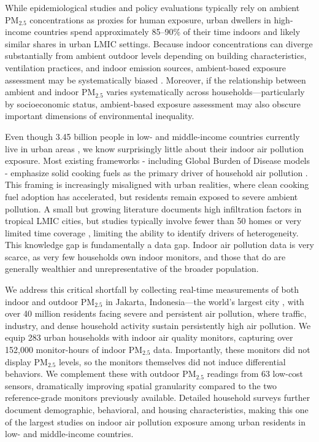 \documentclass[9pt,twocolumn,twoside]{pnas-new}
\begin{document}
While epidemiological studies and policy evaluations typically rely on ambient PM$_{2.5}$ concentrations as proxies for human exposure, urban dwellers in high-income countries spend approximately 85–90\% of their time indoors \citep{klepeis_national_2001} and likely similar shares in urban LMIC settings.
Because indoor concentrations can diverge substantially from ambient outdoor levels depending on building characteristics, ventilation practices, and indoor emission sources, ambient-based exposure assessment may be systematically biased \citep{avery_estimating_2010, evangelopoulos_pm25_2020}. Moreover, if the relationship between ambient and indoor PM$_{2.5}$ varies systematically across households—particularly by socioeconomic status, ambient-based exposure assessment may also obscure important dimensions of environmental inequality. 

Even though 3.45 billion people in low- and middle-income countries currently live in urban areas \citep{noauthor_urban_2023}, we know surprisingly little about their indoor air pollution exposure. Most existing frameworks - including Global Burden of Disease models - emphasize solid cooking fuels as the primary driver of household air pollution \citep{bennitt_global_2025}. This framing is increasingly misaligned with urban realities, where clean cooking fuel adoption has accelerated, but residents remain exposed to severe ambient pollution. A small but growing literature documents high infiltration factors in tropical LMIC cities, but studies typically involve fewer than 50 homes or very limited time coverage \citep{Sahaetal2025, GURLEY201311, Anandetal2022, Hossainetal2021, KAJJOBA20244184, zhou2011household, kephart2020indoor, fandino2020household}, limiting the ability to identify drivers of heterogeneity. This knowledge gap is fundamentally a data gap. Indoor air pollution data is very scarce, as very few households own indoor monitors, and those that do are generally wealthier and unrepresentative of the broader population. 

We address this critical shortfall by collecting real-time measurements of both indoor and outdoor PM$_{2.5}$ in Jakarta, Indonesia—the world's largest city \citep{undesa2025wup}, with over 40 million residents facing severe and persistent air pollution, where traffic, industry, and dense household activity sustain persistently high air pollution. We equip 283 urban households with indoor air quality monitors, capturing over 152,000 monitor-hours of indoor PM$_{2.5}$ data. Importantly, these monitors did not display PM$_{2.5}$ levels, so the monitors themselves did not induce differential behaviors. We complement these with outdoor PM$_{2.5}$ readings from 63 low-cost sensors, dramatically improving spatial granularity compared to the two reference-grade monitors previously available. Detailed household surveys further document demographic, behavioral, and housing characteristics, making this one of the largest studies on indoor air pollution exposure among urban residents in low- and middle-income countries. 
\end{document}
